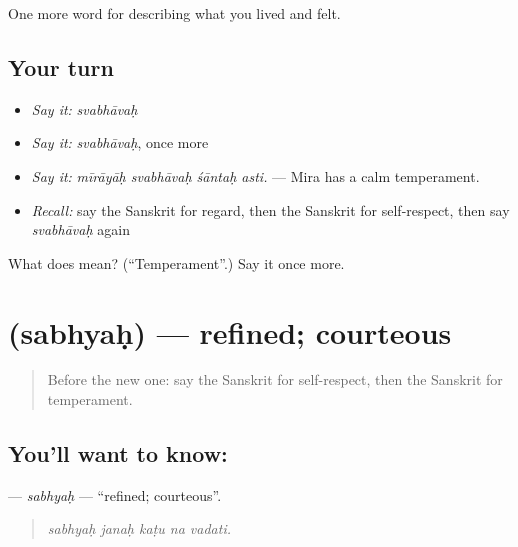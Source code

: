 \begin{grammarlens}[title={What you've built}]
One more word for describing what you lived and felt.
\end{grammarlens}

\subsection*{Your turn}
\begin{itemize}
\raggedright
  \item \emph{Say it:} \emph{svabhāvaḥ}
  \item \emph{Say it:} \emph{svabhāvaḥ}, once more
  \item \emph{Say it:} \emph{mīrāyāḥ svabhāvaḥ śāntaḥ asti.} — Mira has a calm temperament.
  \item \emph{Recall:} say the Sanskrit for regard, then the Sanskrit for self-respect, then say \emph{svabhāvaḥ} again
\end{itemize}

\begin{tcolorbox}[breakable,colback=teal!4,colframe=teal!35!black,title={Before you move on}]
What does  mean? (\textquotedblleft{}Temperament\textquotedblright{}.) Say it once more.
\end{tcolorbox}
\section[\texorpdfstring{\sk{सभ्यः} (sabhyaḥ)}{सभ्यः (sabhyaḥ)}]{ (sabhyaḥ) — refined; courteous}

\label{lesson:SA-C460-sabhyah}



\begin{quote}
Before the new one: say the Sanskrit for self-respect, then the Sanskrit for temperament.
\end{quote}

\subsection*{You'll want to know: }
\textbf{} — \emph{sabhyaḥ} — \textquotedblleft{}refined; courteous\textquotedblright{}.

\begin{quote}
    
\end{quote}

\begin{quote}
\emph{sabhyaḥ janaḥ kaṭu na vadati.}
\end{quote}


